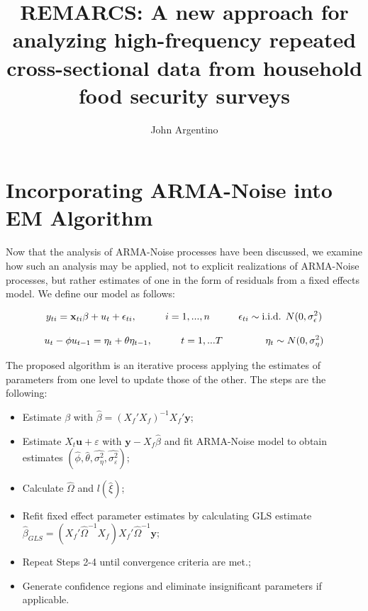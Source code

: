 \documentclass{TUT}
\author{John Argentino}
\title{REMARCS: A new approach for analyzing high-frequency repeated cross-sectional data from household food security surveys}
\numberwithin{equation}{section}
\theoremstyle{plain}
\newcommand{\yy}{\mathbf{y}}
\newcommand{\uu}{\mathbf{u}}
\begin{document}
\tableofcontents
\listoftables
\listoffigures


% 
% 

\section{Incorporating ARMA-Noise into EM Algorithm}

Now that the analysis of ARMA-Noise processes have been discussed, we examine how such an analysis may be applied, not to explicit realizations of ARMA-Noise processes, but rather estimates of one in the form of residuals from a fixed effects model. We define our model as follows:

\begin{equation}
    \label{eq:fullmodel1}
    y_{ti} = \mathbf{x}_{ti}\beta + u_t + \epsilon_{ti}, \hspace{.4in} i = 1,...,n \hspace{.4 in} \epsilon_{ti} \sim \text{i.i.d. } N(0,\sigma_\epsilon^2) 
\end{equation}

\begin{equation}
    \label{eq:fullmodel2}
    u_t - \phi u_{t-1} = \eta_t + \theta \eta_{t-1} , \hspace{.4in} t=1,...T \hspace{.4in}  \hspace{.2in} \eta_t \sim N(0,\sigma_\eta^2) 
\end{equation}

The proposed algorithm is an iterative process applying the estimates of parameters from one level to update those of the other. The steps are the following:

\begin{itemize}
    \item[1)] Estimate ${\beta}$ with $\hat{\beta} = (X_f'X_f)^{-1}X_f'\yy$;
    \item[2)] Estimate $X_t\uu + \varepsilon$ with $\yy - X_f\hat{\beta}$ and fit ARMA-Noise model to obtain estimates $(\hat{\phi}, \hat{\theta}, \hat{\sigma_\eta^2}, \hat{\sigma_\varepsilon^2})$;
    \item[3)] Calculate $\hat{\Omega}$ and $l(\hat{\xi})$;
    \item[4)] Refit fixed effect parameter estimates by calculating GLS estimate $\hat{\beta}_{GLS} = (X_f'\hat{\Omega}^{-1}X_f)X_f'\hat{\Omega}^{-1}\yy$;
    \item[5)] Repeat Steps 2-4 until convergence criteria are met.;
    \item[6)] Generate confidence regions and eliminate insignificant parameters if applicable.
\end{itemize}
\end{document}
